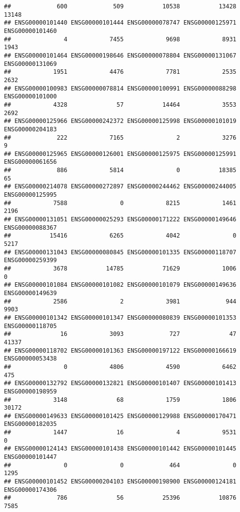 \documentclass[
]{article}
\begin{document}
\begin{verbatim}
##             600             509           10538           13428           13148 
## ENSG00000101440 ENSG00000101444 ENSG00000078747 ENSG00000125971 ENSG00000101460 
##               4            7455            9698            8931            1943 
## ENSG00000101464 ENSG00000198646 ENSG00000078804 ENSG00000131067 ENSG00000131069 
##            1951            4476            7781            2535            2632 
## ENSG00000100983 ENSG00000078814 ENSG00000100991 ENSG00000088298 ENSG00000101000 
##            4328              57           14464            3553            2692 
## ENSG00000125966 ENSG00000242372 ENSG00000125998 ENSG00000101019 ENSG00000204183 
##             222            7165               2            3276               9 
## ENSG00000125965 ENSG00000126001 ENSG00000125975 ENSG00000125991 ENSG00000061656 
##             886            5814               0           18385              65 
## ENSG00000214078 ENSG00000272897 ENSG00000244462 ENSG00000244005 ENSG00000125995 
##            7588               0            8215            1461            2196 
## ENSG00000131051 ENSG00000025293 ENSG00000171222 ENSG00000149646 ENSG00000088367 
##           15416            6265            4042               0            5217 
## ENSG00000131043 ENSG00000080845 ENSG00000101335 ENSG00000118707 ENSG00000259399 
##            3678           14785           71629            1006               0 
## ENSG00000101084 ENSG00000101082 ENSG00000101079 ENSG00000149636 ENSG00000149639 
##            2586               2            3981             944            9903 
## ENSG00000101342 ENSG00000101347 ENSG00000080839 ENSG00000101353 ENSG00000118705 
##              16            3093             727              47           41337 
## ENSG00000118702 ENSG00000101363 ENSG00000197122 ENSG00000166619 ENSG00000053438 
##               0            4806            4590            6462             475 
## ENSG00000132792 ENSG00000132821 ENSG00000101407 ENSG00000101413 ENSG00000198959 
##            3148              68            1759            1806           30172 
## ENSG00000149633 ENSG00000101425 ENSG00000129988 ENSG00000170471 ENSG00000182035 
##            1447              16               4            9531               0 
## ENSG00000124143 ENSG00000101438 ENSG00000101442 ENSG00000101445 ENSG00000101447 
##               0               0             464               0            1295 
## ENSG00000101452 ENSG00000204103 ENSG00000198900 ENSG00000124181 ENSG00000174306 
##             786              56           25396           10876            7585 

\end{verbatim}
\end{document}
